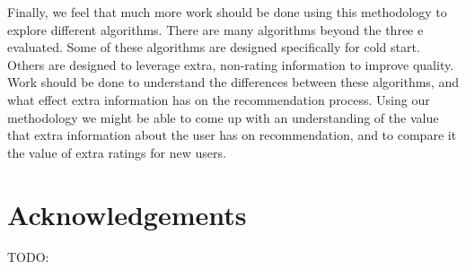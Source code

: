 \documentclass[letterpaper]{sig-alternate}
\begin{document}
  Finally, we feel that much more work should be done using this methodology to explore different algorithms.
  There are many algorithms beyond the three e evaluated.
  Some of these algorithms are designed specifically for cold start.
  Others are designed to leverage extra, non-rating information to improve quality.
  Work should be done to understand the differences between these algorithms, and what effect extra information has on the recommendation process.
  Using our methodology we might be able to come up with an understanding of the value that extra information about the user has on recommendation, and to compare it the value of extra ratings for new users.


\section{Acknowledgements}
 TODO:


\end{document}
